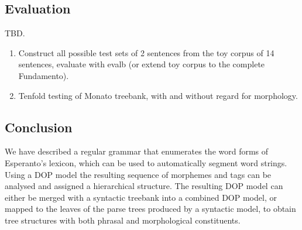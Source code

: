 \documentclass[10pt,a4paper]{article}
\begin{document}
\begin{comment}
\subsection{Todo}

\item parse bitpar chart output into NLTK (currently only most probable derivation; 
  we need $n$ most probable parses and maybe shortest derivation, SL-DOP etc.)
\item use Reta Vortaro / ergane Esperanto dictionary and root lists 
  to induce segmentation / morphology model in a semi-supervised fashion.
\item check morphology coverage against vocabulary of Monato treebank
\item distinguish between morpheme and word boundaries (how?).
  possibly by having a trailing space as part of a morphological analysis 
  (but: this should not block inflection for plurality and accusative (+j and +n respectively).
\item finish report (convert wiki to latex?). evaluation \& conclusion.
  write about Dasgupta (2008) \& is there work on DOP + dependencies? 
  mention DLT as older exemplar model.
\item look at DOP* / U-DOP
\end{comment}


\subsection{Evaluation}

TBD. 

\begin{enumerate}
\item Construct all possible test sets of 2 sentences from the toy corpus of 14
sentences, evaluate with evalb (or extend toy corpus to the complete
Fundamento).
\item Tenfold testing of Monato treebank, with and without regard for morphology.
\end{enumerate}

\subsection{Conclusion}

We have described a regular grammar that enumerates the word forms of
Esperanto's lexicon, which can be used to automatically segment word strings.
Using a DOP model the resulting sequence of morphemes and tags can be analysed
and assigned a hierarchical structure. The resulting DOP model can either be
merged with a syntactic treebank into a combined DOP model, or mapped to the
leaves of the parse trees produced by a syntactic model, to obtain tree
structures with both phrasal and morphological constituents.
\end{document}
